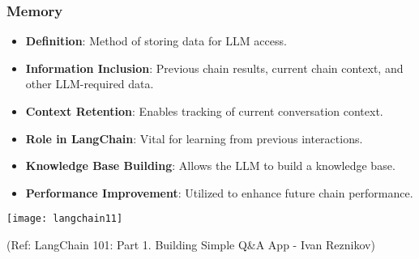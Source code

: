 \begin{frame}[fragile]\frametitle{Memory}

      \begin{itemize}
        \item \textbf{Definition}: Method of storing data for LLM access.
        \item \textbf{Information Inclusion}: Previous chain results, current chain context, and other LLM-required data.
        \item \textbf{Context Retention}: Enables tracking of current conversation context.
        \item \textbf{Role in LangChain}: Vital for learning from previous interactions.
        \item \textbf{Knowledge Base Building}: Allows the LLM to build a knowledge base.
        \item \textbf{Performance Improvement}: Utilized to enhance future chain performance.
      \end{itemize}
			\begin{center}
			\texttt{[image: langchain11]}
			\end{center}	  


			{\tiny (Ref: LangChain 101: Part 1. Building Simple Q\&A App - Ivan Reznikov)}
			
		

\end{frame}

